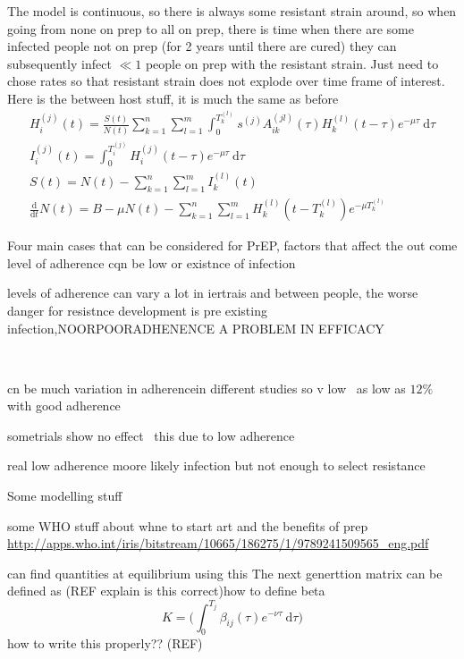 \documentclass[DIV=15]{scrartcl}
\begin{document}
The model is continuous, so there is always some resistant strain around, so when going from none on prep  to all on prep, there is time when there are some infected people not on prep (for 2 years until there are cured) they can subsequently infect $\ll 1$   people on prep with the resistant strain. Just need to chose rates so that resistant strain does not explode over time frame of interest.  Here is the between host stuff, it is much the same as before
\begin{gather*}
H^{(j)}_{i}(t) = \frac{S(t)}{N(t)}  \sum_{k=1}^n \sum_{l=1}^m  \int_0^{T^{(l)}_{k}} s^{(j)} A^{(jl)}_{ik}(\tau) H^{(l)}_{k}(t-\tau)e^{-\mu \tau} \ \text{d}\tau \\
I_i^{(j)}(t) = \int_0^{T_i^{(j)}}  H_i^{(j)}(t-\tau)e^{-\mu \tau} \  \text{d}\tau \\
S(t) = N(t) -  \sum_{k=1}^n \sum_{l=1}^m  I^{(l)}_k(t) \\
\frac{\text{d}}{\text{d} t}  N(t) = B- \mu N(t) -\sum_{k=1}^n \sum_{l=1}^m  H_k^{(l)}(t-T_k^{(l)})e^{-\mu T_k^{(l)}} 
\end{gather*}

 








 Four main cases that can be considered for PrEP, factors that affect the out come level of adherence     cqn be low or existnce of infection
 
 levels of adherence can vary a  lot in iertrais and between people, the worse danger for resistnce development is pre existing infection,NOORPOORADHENENCE A PROBLEM IN EFFICACY
 
 ~\cite{vanderstraten2012}
 
 cn be much variation in adherencein different studies so v low~\cite{corneli2014} as low as $12\%$ with good adherence
 
 
 sometrials show no effect~\cite{vandamme2012} this due to low adherence
 
 real low adherence moore likely infection but not enough to select resistance
  
  Some modelling stuff \cite{diekmann1990}
  
  
  
  some WHO stuff about whne to start art and  the benefits of prep
  \url{http://apps.who.int/iris/bitstream/10665/186275/1/9789241509565_eng.pdf}
  
  
can find quantities at equilibrium using this   
  The next generttion  matrix can be defined as (REF explain is this  correct)how to define beta
  \begin{equation}
   K = \big( \int_0^{T_j}\beta_{ij}(\tau) e^{-\nu \tau} \ \text{d} \tau \big)
  \end{equation}
how to write this properly??  (REF)
\end{document}
